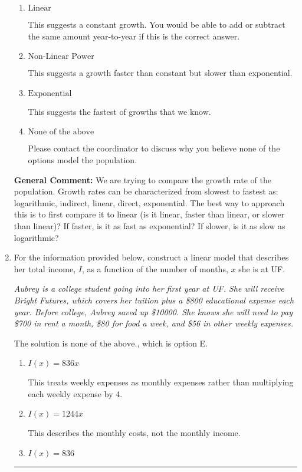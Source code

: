 \documentclass{extbook}[14pt]
\newcommand{\litem}[1]{\item #1

\rule{\textwidth}{0.4pt}}
\begin{document}
\begin{enumerate}
{\begin{enumerate}[label=\Alph*.]
This suggests the slowest of growths that we know.
\item \( \text{Linear} \)

This suggests a constant growth. You would be able to add or subtract the same amount year-to-year if this is the correct answer.
\item \( \text{Non-Linear Power} \)

This suggests a growth faster than constant but slower than exponential.
\item \( \text{Exponential} \)

This suggests the fastest of growths that we know.
\item \( \text{None of the above} \)

Please contact the coordinator to discuss why you believe none of the options model the population.
\end{enumerate}

\textbf{General Comment:} We are trying to compare the growth rate of the population. Growth rates can be characterized from slowest to fastest as: logarithmic, indirect, linear, direct, exponential. The best way to approach this is to first compare it to linear (is it linear, faster than linear, or slower than linear)? If faster, is it as fast as exponential? If slower, is it as slow as logarithmic?
}
\litem{
For the information provided below, construct a linear model that describes her total income, $I$, as a function of the number of months, $x$ she is at UF.

\begin{center}
    \textit{ Aubrey is a college student going into her first year at UF. She will receive Bright Futures, which covers her tuition plus a \$800 educational expense each year. Before college, Aubrey saved up \$10000. She knows she will need to pay \$700 in rent a month, \$80 for food a week, and \$56 in other weekly expenses. }
\end{center}
The solution is \( \text{none of the above.} \), which is option E.\begin{enumerate}[label=\Alph*.]
\item \( I(x) = 836 x \)

This treats weekly expenses as monthly expenses rather than multiplying each weekly expense by 4.
\item \( I(x) = 1244 x \)

This describes the monthly costs, not the monthly income.
\item \( I(x) = 836 \)


\end{enumerate}}
\end{enumerate}
\end{document}
